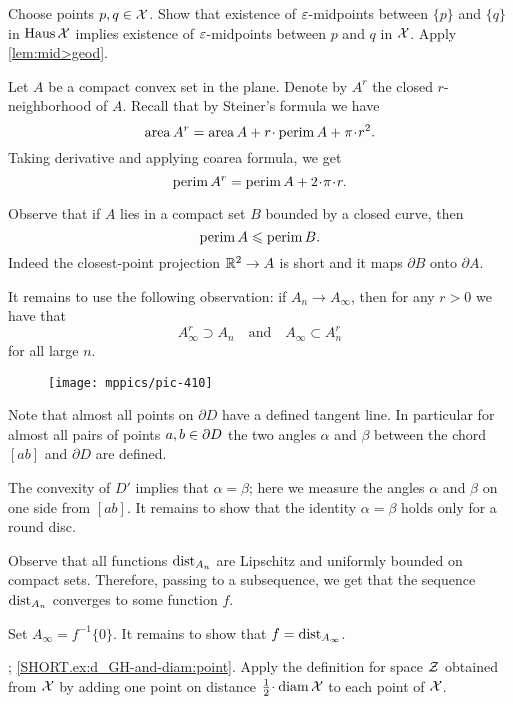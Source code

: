 Choose points $p,q\in\mathcal{X}$. 
Show that existence of $\varepsilon$-midpoints between $\{p\}$ and $\{q\}$ in $\operatorname{\rm Haus}\nolimits\mathcal{X}$ implies existence of $\varepsilon$-midpoints between $p$ and $q$ in $\mathcal{X}$.
Apply \ref{lem:mid>geod}.


Let $A$ be a compact convex set in the plane.
Denote by $A^r$ the closed $r$-neighborhood of $A$.
Recall that by Steiner's formula we have
\[\area A^r=\area A+r\cdot\perim A+\pi\cdot r^2.\]
Taking derivative and applying coarea formula, we get 
\[\perim A^r=\perim A+2\cdot\pi\cdot r.\]

Observe that if $A$ lies in a compact set $B$ bounded by a closed curve, then 
\[\operatorname{\rm perim}\nolimits A\leqslant \operatorname{\rm perim}\nolimits B.\]
Indeed the closest-point projection $\mathbb{R}^2\to A$ is short and it maps $\partial B$ onto $\partial A$.

It remains to use the following observation: if $A_n\to A_\infty$, then for any $r>0$ we have that
\[A_\infty^r\supset A_n
\quad\text{and}\quad
A_\infty\subset A_n^r\]
for all large $n$.

\begin{wrapfigure}{r}{27 mm}
\vskip-6mm
\centering
\texttt{[image: mppics/pic-410]}
\end{wrapfigure}

Note that almost all points on $\partial D$ have a defined tangent line.
In particular for almost all pairs of points $a,b\z\in\partial D$ the two angles $\alpha$ and $\beta$ between the chord $[ab]$ and $ \partial D$ are defined.

The convexity of $D'$ implies that $\alpha=\beta$;
here we measure the angles $\alpha$ and $\beta$ on one side from $[ab]$.
It remains to show that the identity $\alpha=\beta$ holds only for a round disc. 


Observe that all functions $\mathrm{dist}_{A_n}$ are Lipschitz and uniformly bounded on compact sets.
Therefore, passing to a subsequence, we get that the sequence $\mathrm{dist}_{A_n}$ converges to some function $f$.

Set $A_\infty=f^{-1}\{0\}$.
It remains to show that $f=\mathrm{dist}_{A_\infty}$.


\parbf{\ref{ex:d_GH-and-diam}};
\ref{SHORT.ex:d_GH-and-diam:point}.
Apply the definition for space $\mathcal{Z}$ obtained from $\mathcal{X}$ by adding one point on distance $\tfrac12\cdot\diam \spc{X}$ to each point of $\mathcal{X}$.

